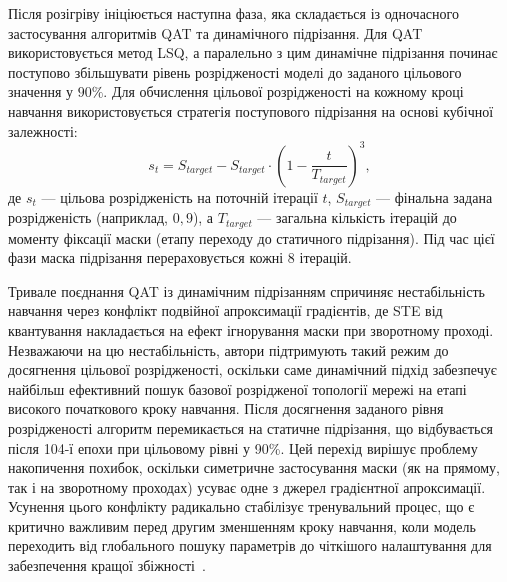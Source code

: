 \documentclass{pma-mthesis}
\begin{document}

Після розігріву ініціюється наступна фаза, яка складається із одночасного застосування алгоритмів QAT та динамічного підрізання. Для QAT використовується метод LSQ, а паралельно з цим динамічне підрізання починає поступово збільшувати рівень розрідженості моделі до заданого цільового значення у $90\%$. Для обчислення цільової розрідженості на кожному кроці навчання використовується стратегія поступового підрізання на основі кубічної залежності:
\begin{equation}
    s_t = S_{target} - S_{target} \cdot \left( 1 - \frac{t}{T_{target}} \right)^3,
\end{equation}
де $s_t$ --- цільова розрідженість на поточній ітерації $t$, $S_{target}$ --- фінальна задана розрідженість (наприклад, $0,9$), а $T_{target}$ --- загальна кількість ітерацій до моменту фіксації маски (етапу переходу до статичного підрізання). Під час цієї фази маска підрізання перераховується кожні 8 ітерацій. 

Тривале поєднання QAT із динамічним підрізанням спричиняє нестабільність навчання через конфлікт подвійної апроксимації градієнтів, де STE від квантування накладається на ефект ігнорування маски при зворотному проході. Незважаючи на цю нестабільність, автори підтримують такий режим до досягнення цільової розрідженості, оскільки саме динамічний підхід забезпечує найбільш ефективний пошук базової розрідженої топології мережі на етапі високого початкового кроку навчання. Після досягнення заданого рівня розрідженості алгоритм перемикається на статичне підрізання, що відбувається після 104-ї епохи при цільовому рівні у 90\%. Цей перехід вирішує проблему накопичення похибок, оскільки симетричне застосування маски (як на прямому, так і на зворотному проходах) усуває одне з джерел градієнтної апроксимації. Усунення цього конфлікту радикально стабілізує тренувальний процес, що є критично важливим перед другим зменшенням кроку навчання, коли модель переходить від глобального пошуку параметрів до чіткішого налаштування для забезпечення кращої збіжності~\cite{10946020}.
\end{document}
